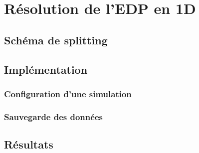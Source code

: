 
\chapter{Résolution de l'EDP en 1D} %

\label{Chapter3} %


\section{Schéma de splitting}


\section{Implémentation}


\subsection{Configuration d'une simulation}


\subsection{Sauvegarde des données}


\section{Résultats}

